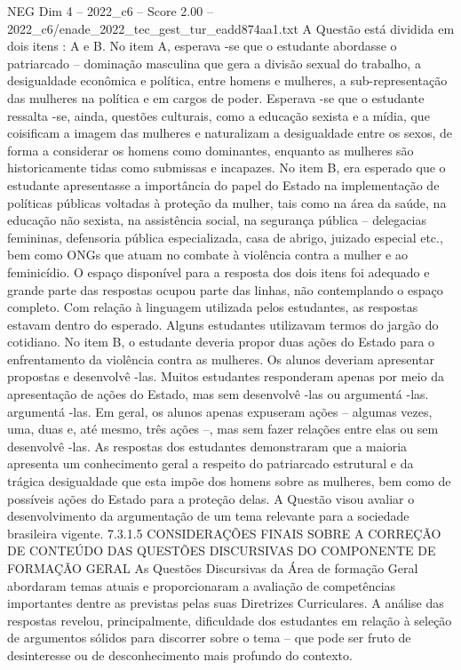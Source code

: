 \begin{textsample}{NEG Dim 4 – 2022\_c6 – Score 2.00 – 2022\_c6/enade\_2022\_tec\_gest\_tur\_eadd874aa1.txt}
A Questão está dividida em dois itens : A e B.
No item A, esperava -se que o estudante abordasse o patriarcado – dominação masculina que gera a divisão sexual do trabalho, a desigualdade econômica e política, entre homens e mulheres, a sub-representação das mulheres na política e em cargos de poder.
Esperava -se que o estudante ressalta -se, ainda, questões culturais, como a educação sexista e a mídia, que coisificam a imagem das mulheres e naturalizam a desigualdade entre os sexos, de forma a considerar os homens como dominantes, enquanto as mulheres são historicamente tidas como submissas e incapazes.
No item B, era esperado que o estudante apresentasse a importância do papel do Estado na implementação de políticas públicas voltadas à proteção da mulher, tais como na área da saúde, na educação não sexista, na assistência social, na segurança pública – delegacias femininas, defensoria pública especializada, casa de abrigo, juizado especial etc., bem como ONGs que atuam no combate à violência contra a mulher e ao feminicídio.
O espaço disponível para a resposta dos dois itens foi adequado e grande parte das respostas ocupou parte das linhas, não contemplando o espaço completo.
Com relação à linguagem utilizada pelos estudantes, as respostas estavam dentro do esperado.
Alguns estudantes utilizavam termos do jargão do cotidiano.
No item B, o estudante deveria propor duas ações do Estado para o enfrentamento da violência contra as mulheres.
Os alunos deveriam apresentar propostas e desenvolvê -las.
Muitos estudantes responderam apenas por meio da apresentação de ações do Estado, mas sem desenvolvê -las ou argumentá -las. argumentá -las.
Em geral, os alunos apenas expuseram ações – algumas vezes, uma, duas e, até mesmo, três ações –, mas sem fazer relações entre elas ou sem desenvolvê -las.
As respostas dos estudantes demonstraram que a maioria apresenta um conhecimento geral a respeito do patriarcado estrutural e da trágica desigualdade que esta impõe dos homens sobre as mulheres, bem como de possíveis ações do Estado para a proteção delas.
A Questão visou avaliar o desenvolvimento da argumentação de um tema relevante para a sociedade brasileira vigente. 7.3.1.5 CONSIDERAÇÕES FINAIS SOBRE A CORREÇÃO DE CONTEÚDO DAS QUESTÕES DISCURSIVAS DO COMPONENTE DE FORMAÇÃO GERAL As Questões Discursivas da Área de formação Geral abordaram temas atuais e proporcionaram a avaliação de competências importantes dentre as previstas pelas suas Diretrizes Curriculares.
A análise das respostas revelou, principalmente, dificuldade dos estudantes em relação à seleção de argumentos sólidos para discorrer sobre o tema – que pode ser fruto de desinteresse ou de desconhecimento mais profundo do contexto.

\end{textsample}
